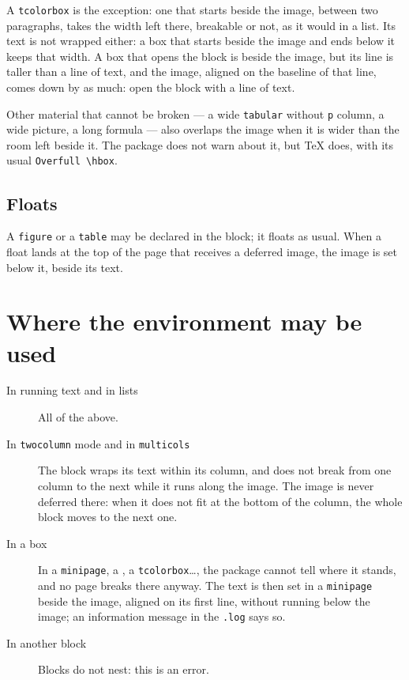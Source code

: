 \documentclass[a4paper,11pt]{article}
\providecommand\env[1]{\texttt{#1}}
\begin{document}
A \env{tcolorbox} is the exception: one that starts beside the image, between two paragraphs, takes the width left there, breakable or not, as it would in a list. Its text is not wrapped either: a box that starts beside the image and ends below it keeps that width. A box that opens the block is beside the image, but its line is taller than a line of text, and the image, aligned on the baseline of that line, comes down by as much: open the block with a line of text.

Other material that cannot be broken --- a wide \env{tabular} without \texttt{p} column, a wide picture, a long formula --- also overlaps the image when it is wider than the room left beside it. The package does not warn about it, but \TeX{} does, with its usual \texttt{Overfull \textbackslash hbox}.

\subsection{Floats}

A \env{figure} or a \env{table} may be declared in the block; it floats as usual. When a float lands at the top of the page that receives a deferred image, the image is set below it, beside its text.

\section{Where the environment may be used}\label{sec:where}

\begin{description}
\item[In running text and in lists] All of the above.
\item[In \texttt{twocolumn} mode and in \env{multicols}] The block wraps its text within its column, and does not break from one column to the next while it runs along the image. The image is never deferred there: when it does not fit at the bottom of the column, the whole block moves to the next one.
\item[In a box] In a \env{minipage}, a , a \env{tcolorbox}\dots, the package cannot tell where it stands, and no page breaks there anyway. The text is then set in a \env{minipage} beside the image, aligned on its first line, without running below the image; an information message in the \texttt{.log} says so.
\item[In another block] Blocks do not nest: this is an error.
\end{description}
\end{document}
